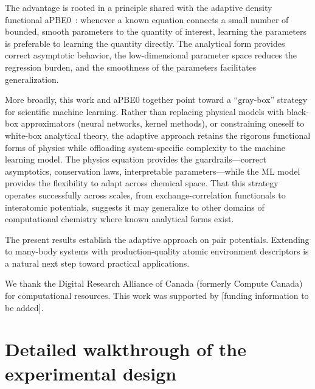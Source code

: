 \documentclass[aps,prb,twocolumn,superscriptaddress,longbibliography,floatfix]{revtex4-2}
\begin{document}
The advantage is rooted in a principle shared with the adaptive density functional aPBE0~\cite{Khan2025}: whenever a known equation connects a small number of bounded, smooth parameters to the quantity of interest, learning the parameters is preferable to learning the quantity directly. The analytical form provides correct asymptotic behavior, the low-dimensional parameter space reduces the regression burden, and the smoothness of the parameters facilitates generalization.

More broadly, this work and aPBE0 together point toward a ``gray-box'' strategy for scientific machine learning. Rather than replacing physical models with black-box approximators (neural networks, kernel methods), or constraining oneself to white-box analytical theory, the adaptive approach retains the rigorous functional forms of physics while offloading system-specific complexity to the machine learning model. The physics equation provides the guardrails---correct asymptotics, conservation laws, interpretable parameters---while the ML model provides the flexibility to adapt across chemical space. That this strategy operates successfully across scales, from exchange-correlation functionals to interatomic potentials, suggests it may generalize to other domains of computational chemistry where known analytical forms exist.

The present results establish the adaptive approach on pair potentials. Extending to many-body systems with production-quality atomic environment descriptors is a natural next step toward practical applications.


\begin{acknowledgments}
We thank the Digital Research Alliance of Canada (formerly Compute Canada) for computational resources. This work was supported by [funding information to be added].
\end{acknowledgments}




\clearpage
\onecolumngrid
\appendix

\section{Detailed walkthrough of the experimental design}
\label{app:walkthrough}
\end{document}
